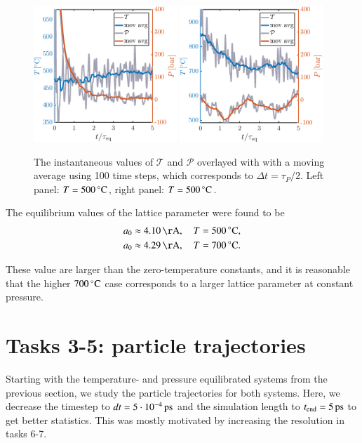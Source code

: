 \begin{figure}[!ht]
\begin{center}
  \includegraphics[width=0.48\textwidth]{../figures/TP-eq-500} 
    \includegraphics[width=0.48\textwidth]{../figures/TP-eq-700} 
  \caption{The instantaneous values of $\mathcal{T}$ and $\mathcal{P}$ overlayed with with a moving average using 100 time steps, which corresponds to $\Delta t = \tau_P/2$. Left panel: $T=\unit[500]{^\circ C}$,  right panel: $T=\unit[500]{^\circ C}$.}
  \label{fig:eq}
\end{center}
\end{figure}


The equilibrium values of the lattice parameter were found to be 
\begin{align}
a_0 &\approx \unit[4.10]{\AA}, \quad T=\unit[500]{^\circ C}, \\
a_0 &\approx \unit[4.29]{\AA}, \quad T=\unit[700]{^\circ C} .
\end{align} 

These value are larger than the zero-temperature constants, and it is reasonable that the higher $\unit[700]{^\circ C}$ case corresponds to a larger lattice parameter at constant pressure. 

\section*{Tasks 3-5: particle trajectories}
Starting with the temperature- and pressure equilibrated systems from the previous section, we study the particle trajectories for both systems. Here, we decrease the timestep to   $dt       = \unit[5\cdot 10^{-4}]{ps}$ and the simulation length to $t_{\rm end} = \unit[5]{ps}$ to get better statistics. This was mostly motivated by increasing the resolution in tasks 6-7. 

